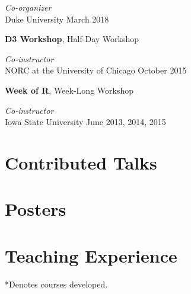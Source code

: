 \documentclass[margin,line]{res}
\begin{document}
\begin{resume}
\vspace{-.4cm}
{\em Co-organizer} \hfill \\

\vspace{-.7cm}
Duke University \hfill March 2018


{\bf D3 Workshop}, Half-Day Workshop

\vspace{-.4cm}
{\em Co-instructor} \hfill \\

\vspace{-.7cm}
NORC at the University of Chicago \hfill October 2015


{\bf Week of R}, Week-Long Workshop

\vspace{-.4cm}
{\em Co-instructor} \hfill \\

\vspace{-.7cm}
Iowa State University \hfill June 2013, 2014, 2015



\section{\sc Contributed Talks}
\printbibliography[keyword=talk-contributed, heading=none, resetnumbers=true]

\section{\sc Posters}
\printbibliography[keyword=poster, heading=none, resetnumbers=true]

\section{\sc Teaching Experience}
*Denotes courses developed.\\

\vspace{-.4cm}


\end{resume}
\end{document}
